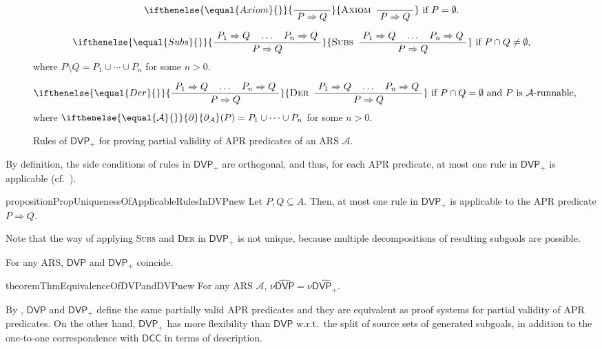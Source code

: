 \documentclass[10pt,a4paper]{article}
\def\cA{\mathcal{A}}
\def\cR{\mathcal{R}}
\newcommand{\ReachPred}[2]{#1 \Rightarrow #2}
\newcommand{\Derivative}[1][\cR]{\ifthenelse{\equal{#1}{}}{\partial}{\partial_{#1}}}
\newcommand{\RuleName}[1]{{\rm \textsc{#1}}}
\newcommand{\InfRule}[3][]{\ifthenelse{\equal{#1}{}}{\displaystyle\frac{~ #2 ~}{~ #3 ~}}{\mbox{\rm\RuleName{#1}} ~\, \displaystyle\frac{~ #2 ~}{~ #3 ~}
}}
\newcommand{\DVP}[1][]{\mathsf{DVP}}
\newcommand{\DVPnew}[1][]{\mathsf{DVP}_+}
\newcommand{\DCC}[1][]{\mathsf{DCC}}
\begin{document}
\begin{figure}[t]
	\begin{minipage}[t]{.4\textwidth}
		\[
			\InfRule[Axiom]{}{\ReachPred{P}{Q}
			}
			~\mbox{if $P = \emptyset$.}
		\]
	\end{minipage}
	\begin{minipage}[t]{.59\textwidth}
		\[
			\InfRule[Subs]{\ReachPred{P_1}{Q}
				\quad
				\ldots
				\quad
				\ReachPred{P_n}{Q}
			}{\ReachPred{P}{Q}
			}
			~\mbox{if $P \cap Q  \ne \emptyset$,}
		\]
		\qquad
		where $P \setminus Q = P_1 \cup \cdots \cup P_n$ for some $n > 0$.
	\end{minipage}

	\begin{minipage}{.99\textwidth}
		\[
			\InfRule[Der]{\ReachPred{P_1}{Q}
				\quad
				\ldots
				\quad
				\ReachPred{P_n}{Q}
			}{\ReachPred{P}{Q}
			}
			~\mbox{if $P \cap Q = \emptyset$ and $P$ is $\cA$-runnable,}
		\]
		\qquad
		where $\Derivative[\cA](P) = P_1 \cup \cdots \cup P_n$ for some $n > 0$.
	\end{minipage}

	\caption{Rules of $\DVPnew$ for proving partial validity of APR predicates of an ARS $\cA$.}
	\label{fig:rules-of-DVPnew}
\end{figure}

By definition, the side conditions of rules in $\DVPnew$ are orthogonal, and thus,
for each APR predicate, at most one rule in $\DVPnew$ is applicable (cf.~\cite{KN24jip}).
\begin{restatable}{proposition}{PropUniquenessOfApplicableRulesInDVPnew}
	\label{prop:uniqueness-of-applicable-rules-in-DVPnew}
	Let $P,Q \subseteq A$.
	Then, at most one rule in $\DVPnew$ is applicable to the APR predicate $\ReachPred{P}{Q}$.
\end{restatable}
Note that the way of applying \RuleName{Subs} and \RuleName{Der} in $\DVPnew$ is not unique, because multiple decompositions of resulting subgoals are possible.

For any ARS, $\DVP$ and $\DVPnew$ coincide.
\begin{restatable}{theorem}{ThmEquivalenceOfDVPandDVPnew}
	\label{thm:equivalence-of-DVP-and-DVPnew}
	For any ARS $\cA$, $\nu\widehat{\DVP[\cA]} = \nu\widehat{\DVPnew[\cA]}$.
\end{restatable}
By , $\DVP$ and $\DVPnew$ define the same partially valid APR predicates and they are equivalent as proof systems for partial validity of APR predicates.
On the other hand, $\DVPnew$ has more flexibility than $\DVP$ w.r.t.\ the split of source sets of generated subgoals, in addition to the one-to-one correspondence with $\DCC$ in terms of description.
\end{document}
